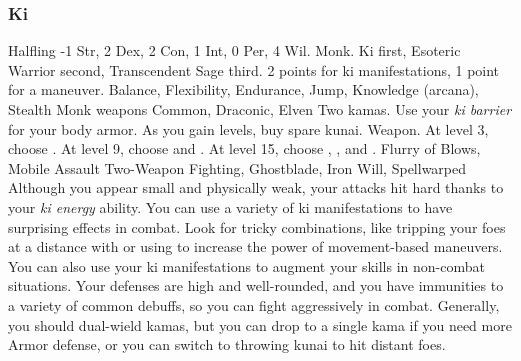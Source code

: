         \subsubsection{Ki}
             Halfling
             -1 Str, 2 Dex, 2 Con, 1 Int, 0 Per, 4 Wil.
             Monk.
             Ki first, Esoteric Warrior second, Transcendent Sage third.
             2 points for ki manifestations, 1 point for a maneuver.
             Balance, Flexibility, Endurance, Jump, Knowledge (arcana), Stealth
             Monk weapons
             Common, Draconic, Elven
             Two kamas. Use your \textit{ki barrier} for your body armor. As you gain levels, buy spare kunai.
             Weapon.
                At level 3, choose .
                At level 9, choose  and .
                At level 15, choose , , and .
             Flurry of Blows, Mobile Assault
             Two-Weapon Fighting, Ghostblade, Iron Will, Spellwarped
             Although you appear small and physically weak, your attacks hit hard thanks to your \textit{ki energy} ability.
            You can use a variety of ki manifestations to have surprising effects in combat.
            Look for tricky combinations, like tripping your foes at a distance with  or using  to increase the power of movement-based maneuvers.
            You can also use your ki manifestations to augment your skills in non-combat situations.
            Your defenses are high and well-rounded, and you have immunities to a variety of common debuffs, so you can fight aggressively in combat.
            Generally, you should dual-wield kamas, but you can drop to a single kama if you need more Armor defense, or you can switch to throwing kunai to hit distant foes.

